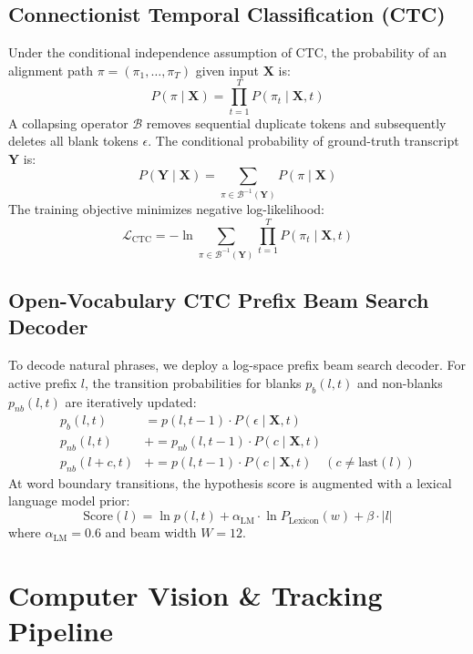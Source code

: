 \documentclass[conference,compsoc,10pt]{IEEEtran}
\begin{document}
\subsection{Connectionist Temporal Classification (CTC)}
Under the conditional independence assumption of CTC, the probability of an alignment path $\pi = (\pi_1, \dots, \pi_T)$ given input $\mathbf{X}$ is:
\begin{equation}
P(\pi \mid \mathbf{X}) = \prod_{t=1}^{T} P(\pi_t \mid \mathbf{X}, t)
\end{equation}
A collapsing operator $\mathcal{B}$ removes sequential duplicate tokens and subsequently deletes all blank tokens $\epsilon$. The conditional probability of ground-truth transcript $\mathbf{Y}$ is:
\begin{equation}
P(\mathbf{Y} \mid \mathbf{X}) = \sum_{\pi \in \mathcal{B}^{-1}(\mathbf{Y})} P(\pi \mid \mathbf{X})
\end{equation}
The training objective minimizes negative log-likelihood:
\begin{equation}
\mathcal{L}_{\text{CTC}} = -\ln \sum_{\pi \in \mathcal{B}^{-1}(\mathbf{Y})} \prod_{t=1}^{T} P(\pi_t \mid \mathbf{X}, t)
\end{equation}

\subsection{Open-Vocabulary CTC Prefix Beam Search Decoder}
To decode natural phrases, we deploy a log-space prefix beam search decoder. For active prefix $l$, the transition probabilities for blanks $p_b(l, t)$ and non-blanks $p_{nb}(l, t)$ are iteratively updated:
\begin{align}
p_b(l, t) &= p(l, t-1) \cdot P(\epsilon \mid \mathbf{X}, t) \\
p_{nb}(l, t) &\mathrel{+}= p_{nb}(l, t-1) \cdot P(c \mid \mathbf{X}, t) \\
p_{nb}(l + c, t) &\mathrel{+}= p(l, t-1) \cdot P(c \mid \mathbf{X}, t) \quad (c \ne \text{last}(l))
\end{align}
At word boundary transitions, the hypothesis score is augmented with a lexical language model prior:
\begin{equation}
\text{Score}(l) = \ln p(l, t) + \alpha_{\text{LM}} \cdot \ln P_{\text{Lexicon}}(w) + \beta \cdot |l|
\end{equation}
where $\alpha_{\text{LM}} = 0.6$ and beam width $W = 12$.

\section{Computer Vision \& Tracking Pipeline}
\end{document}
